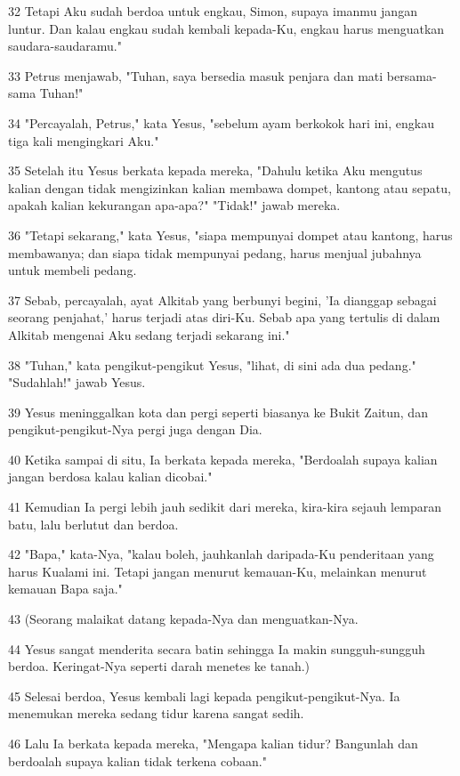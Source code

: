 \par 32 Tetapi Aku sudah berdoa untuk engkau, Simon, supaya imanmu jangan luntur. Dan kalau engkau sudah kembali kepada-Ku, engkau harus menguatkan saudara-saudaramu."
\par 33 Petrus menjawab, "Tuhan, saya bersedia masuk penjara dan mati bersama-sama Tuhan!"
\par 34 "Percayalah, Petrus," kata Yesus, "sebelum ayam berkokok hari ini, engkau tiga kali mengingkari Aku."
\par 35 Setelah itu Yesus berkata kepada mereka, "Dahulu ketika Aku mengutus kalian dengan tidak mengizinkan kalian membawa dompet, kantong atau sepatu, apakah kalian kekurangan apa-apa?" "Tidak!" jawab mereka.
\par 36 "Tetapi sekarang," kata Yesus, "siapa mempunyai dompet atau kantong, harus membawanya; dan siapa tidak mempunyai pedang, harus menjual jubahnya untuk membeli pedang.
\par 37 Sebab, percayalah, ayat Alkitab yang berbunyi begini, 'Ia dianggap sebagai seorang penjahat,' harus terjadi atas diri-Ku. Sebab apa yang tertulis di dalam Alkitab mengenai Aku sedang terjadi sekarang ini."
\par 38 "Tuhan," kata pengikut-pengikut Yesus, "lihat, di sini ada dua pedang." "Sudahlah!" jawab Yesus.
\par 39 Yesus meninggalkan kota dan pergi seperti biasanya ke Bukit Zaitun, dan pengikut-pengikut-Nya pergi juga dengan Dia.
\par 40 Ketika sampai di situ, Ia berkata kepada mereka, "Berdoalah supaya kalian jangan berdosa kalau kalian dicobai."
\par 41 Kemudian Ia pergi lebih jauh sedikit dari mereka, kira-kira sejauh lemparan batu, lalu berlutut dan berdoa.
\par 42 "Bapa," kata-Nya, "kalau boleh, jauhkanlah daripada-Ku penderitaan yang harus Kualami ini. Tetapi jangan menurut kemauan-Ku, melainkan menurut kemauan Bapa saja."
\par 43 (Seorang malaikat datang kepada-Nya dan menguatkan-Nya.
\par 44 Yesus sangat menderita secara batin sehingga Ia makin sungguh-sungguh berdoa. Keringat-Nya seperti darah menetes ke tanah.)
\par 45 Selesai berdoa, Yesus kembali lagi kepada pengikut-pengikut-Nya. Ia menemukan mereka sedang tidur karena sangat sedih.
\par 46 Lalu Ia berkata kepada mereka, "Mengapa kalian tidur? Bangunlah dan berdoalah supaya kalian tidak terkena cobaan."
